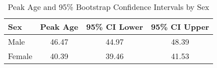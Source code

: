 
\begin{table}[ht]
\centering
\begin{tabular}{lccc}
\hline
Sex & Peak Age & 95\% CI Lower & 95\% CI Upper \\
\hline
Male &  46.47  &  44.97  &  48.39  \\
Female &  40.39  &  39.46  &  41.53  \\
\hline
\end{tabular}
\caption{Peak Age and 95\% Bootstrap Confidence Intervals by Sex}
\label{tab:peak_age}
\end{table}
